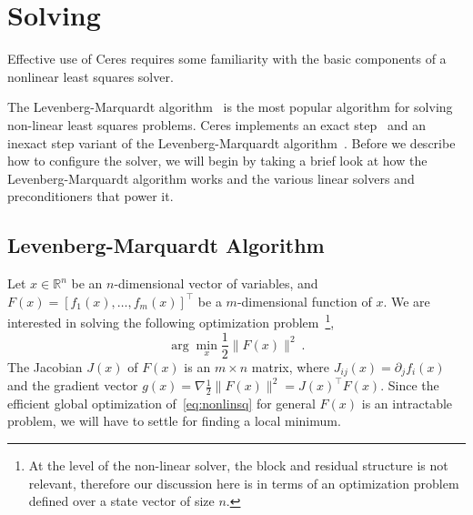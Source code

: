 \chapter{Solving}
Effective use of Ceres requires some familiarity with the basic components of a nonlinear least squares solver. 

The Levenberg-Marquardt algorithm~\cite{levenberg1944method, marquardt1963algorithm} is the most popular algorithm for solving non-linear least squares problems. Ceres implements an exact step~\cite{madsen2004methods} and an inexact step variant of the Levenberg-Marquardt algorithm~\cite{wright1985inexact,nash1990assessing}.  Before we describe how to configure the solver, we will begin by taking a brief look at how the Levenberg-Marquardt algorithm works and the various linear solvers and preconditioners that power it.


\section{Levenberg-Marquardt Algorithm}
Let $x \in \mathbb{R}^{n}$ be an $n$-dimensional vector of variables, and
$ F(x) = \left[f_1(x),   \hdots,  f_{m}(x) \right]^{\top}$ be a $m$-dimensional function of $x$.  We are interested in solving the following optimization problem~\footnote{At the level of the non-linear solver, the block and residual structure is not relevant, therefore our discussion here is in terms of an optimization problem defined over a state vector of size $n$.},
\begin{equation}
        \arg \min_x \frac{1}{2}\|F(x)\|^2\ .
        \label{eq:nonlinsq}
\end{equation}
The Jacobian $J(x)$ of $F(x)$ is an $m\times n$ matrix, where $J_{ij}(x) = \partial_j f_i(x)$  and the gradient vector $g(x) = \nabla  \frac{1}{2}\|F(x)\|^2 = J(x)^\top F(x)$. Since the efficient global optimization of~\eqref{eq:nonlinsq} for general $F(x)$ is an intractable problem, we will have to settle for finding a local minimum.

